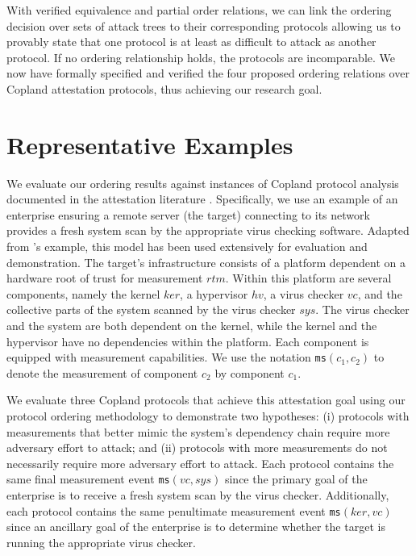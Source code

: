 \documentclass[runningheads]{llncs}
\theoremstyle{definition}
\begin{document}
With verified equivalence and partial order relations, we can link the
ordering decision over sets of attack trees to their corresponding
protocols allowing us to provably state that one protocol is at least
as difficult to attack as another protocol. If no ordering relationship
holds, the protocols are incomparable. We now have formally specified
and verified the four proposed ordering relations over Copland
attestation protocols, thus achieving our research goal.

\section{Representative Examples}

We evaluate our ordering results against instances of Copland protocol
analysis documented in the attestation literature
\citep{Rowe:2021:OnOrdering,Coker::Principles-of-R}. Specifically, we
use an example of an enterprise ensuring a remote server (the target)
connecting to its network provides a fresh system scan by the
appropriate virus checking software. Adapted from
\citeauthor{Rowe:2021:OnOrdering}'s \citep{Rowe:2016:Confining}
example, this model has been used extensively for evaluation and
demonstration.  The target's infrastructure consists of a platform
dependent on a hardware root of trust for measurement $rtm$. Within
this platform are several components, namely the kernel $ker$, a
hypervisor $hv$, a virus checker $vc$, and the collective parts of the
system scanned by the virus checker $sys$. The virus checker and the
system are both dependent on the kernel, while the kernel and the
hypervisor have no dependencies within the platform. Each component is
equipped with measurement capabilities. We use the notation
\texttt{ms}$(c_1,c_2)$ to denote the measurement of component $c_2$ by
component $c_1$.

We evaluate three Copland protocols that achieve this attestation goal
using our protocol ordering methodology to demonstrate two hypotheses:
(i) protocols with measurements that better mimic the system's dependency 
chain require more adversary effort to attack; and 
(ii) protocols with more measurements do not 
necessarily require more adversary effort to attack. 
Each protocol contains the same final measurement event 
\texttt{ms}$(vc,sys)$ since
the primary goal of the enterprise is to receive a fresh system scan
by the virus checker. Additionally, each protocol contains the same
penultimate measurement event \texttt{ms}$(ker,vc)$ since an ancillary
goal of the enterprise is to determine whether the target is running
the appropriate virus checker.
\end{document}
